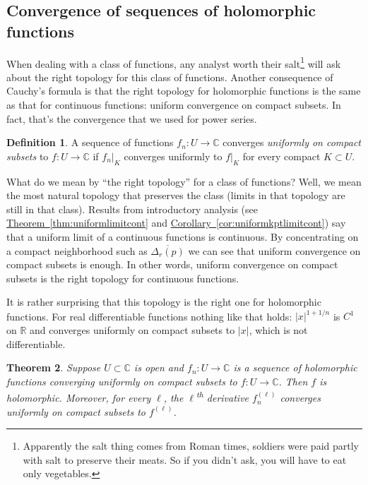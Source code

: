 \documentclass[12pt,openany]{book}
\newcommand{\sabs}[1]{\lvert {#1} \rvert}
\newcommand{\C}{{\mathbb{C}}}
\newcommand{\R}{{\mathbb{R}}}
\newcommand{\myindex}[1]{#1\index{#1}}
\newcommand{\myquote}[1]{``#1''}
\theoremstyle{plain}
\newtheorem{thm}{Theorem}[section]
\theoremstyle{remark}
\theoremstyle{definition}
\newtheorem{defn}[thm]{Definition}
\theoremstyle{exercise}
\theoremstyle{example}
\newcommand{\thmref}[1]{\hyperref[#1]{Theorem~\ref*{#1}}}
\newcommand{\corref}[1]{\hyperref[#1]{Corollary~\ref*{#1}}}
\begin{document}
\subsection{Convergence of sequences of holomorphic functions}

When dealing with a class of functions, any analyst worth their
salt\footnote{Apparently the salt thing
comes from Roman times, soldiers were
paid partly with salt to preserve their meats.  So if you didn't ask,
you will have to eat only vegetables.} will ask about the right topology for this class of
functions.
Another consequence of Cauchy's formula is that the right topology for
holomorphic functions is the same as that for continuous functions: uniform
convergence on compact subsets.  In fact, that's the convergence that we
used for power series.

\begin{defn}
A sequence of functions $f_n \colon U \to \C$ converges
\emph{\myindex{uniformly on compact subsets}}%
to $f \colon U \to \C$ if
$f_n|_K$ converges uniformly to $f|_K$
for every compact $K \subset U$.
\end{defn}

What do we mean by \myquote{the right topology} for a class of functions?
Well, we mean the most natural
topology that preserves the class (limits in that topology are still in that
class).  
Results from introductory analysis
(see \thmref{thm:uniformlimitcont} and \corref{cor:uniformkptlimitcont})
say that a uniform limit of a continuous functions is continuous.
By concentrating on a compact neighborhood such as $\overline{\Delta_r(p)}$
we can see that uniform convergence on compact subsets is enough.
In other words, uniform convergence on compact subsets is the right topology
for continuous functions.

It is rather surprising that this topology is the right one for holomorphic
functions.  For real
differentiable functions nothing like that holds: $\sabs{x}^{1+1/n}$
is $C^1$ on $\R$ and converges uniformly on compact subsets to $\sabs{x}$,
which is not differentiable.

\begin{thm} \label{thm:unifoncompact}
Suppose $U \subset \C$ is open and $f_n \colon U \to \C$ is a sequence
of holomorphic functions converging uniformly on compact subsets to
$f \colon U \to \C$.  Then $f$ is holomorphic.
Moreover, for every $\ell$, the $\ell$\textsuperscript{th} derivative
$f_n^{(\ell)}$ converges uniformly on compact subsets to $f^{(\ell)}$.
\end{thm}
\end{document}

